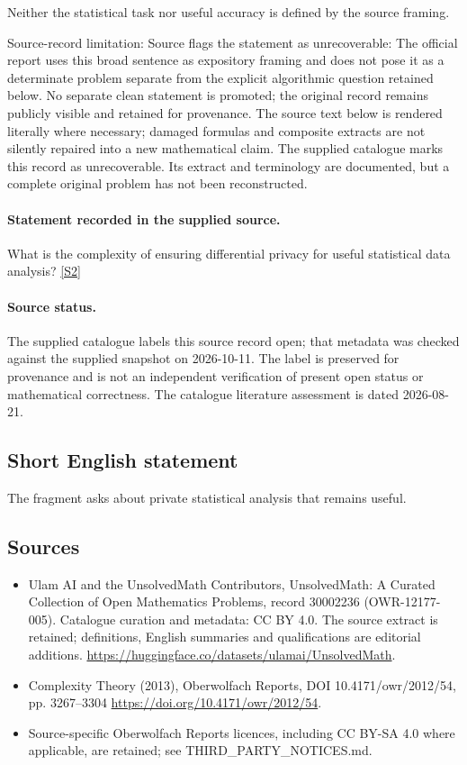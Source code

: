\documentclass[11pt]{article}
\begin{document}
Neither the statistical task nor useful accuracy is defined by the source framing.

Source-record limitation: Source flags the statement as unrecoverable: The official report uses this broad sentence as expository framing and does not pose it as a determinate problem separate from the explicit algorithmic question retained below. No separate clean statement is promoted; the original record remains publicly visible and retained for provenance.
The source text below is rendered literally where necessary; damaged formulas and composite extracts are not silently repaired into a new mathematical claim.
The supplied catalogue marks this record as unrecoverable. Its extract and terminology are documented, but a complete original problem has not been reconstructed.
\paragraph{Statement recorded in the supplied source.}
What is the complexity of ensuring differential privacy for useful statistical data analysis? \href{https://doi.org/10.4171/owr/2012/54}{[S2]}
\paragraph{Source status.}
The supplied catalogue labels this source record open; that metadata was checked against the supplied snapshot on 2026-10-11. The label is preserved for provenance and is not an independent verification of present open status or mathematical correctness. The catalogue literature assessment is dated 2026-08-21.
\subsection{Short English statement}
The fragment asks about private statistical analysis that remains useful.
\subsection{Sources}
\begin{itemize}
\item[S1] Ulam AI and the UnsolvedMath Contributors, UnsolvedMath: A Curated Collection of Open Mathematics Problems, record 30002236 (OWR-12177-005). Catalogue curation and metadata: CC BY 4.0. The source extract is retained; definitions, English summaries and qualifications are editorial additions.
\url{https://huggingface.co/datasets/ulamai/UnsolvedMath}.
\item[S2] Complexity Theory (2013), Oberwolfach Reports, DOI 10.4171/owr/2012/54, pp. 3267--3304
\url{https://doi.org/10.4171/owr/2012/54}.
\item Source-specific Oberwolfach Reports licences, including CC BY-SA 4.0 where applicable, are retained; see THIRD\_PARTY\_NOTICES.md.
\end{itemize}
\end{document}
